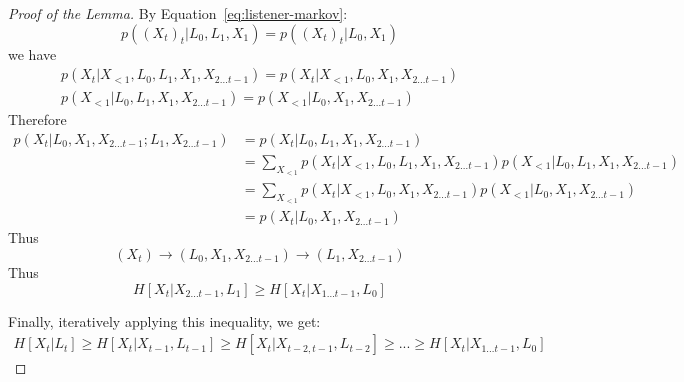 \documentclass[11pt,letterpaper]{article}
\begin{document}
	\begin{proof}[Proof of the Lemma]

By Equation~\ref{eq:listener-markov}:
	\begin{equation}
p((X_{t})_t| L_0, L_1, X_1)   = p((X_{t})_t| L_0, X_1)
	\end{equation}
we have
	\begin{align*}
p(X_t|X_{<1}, L_0, L_1, X_1, X_{2 \dots t-1}) = p(X_t|X_{<1}, L_0,  X_1, X_{2 \dots t-1}) \\
p(X_{<1}| L_0, L_1, X_1, X_{2 \dots t-1})   = p(X_{<1}| L_0, X_1, X_{2 \dots t-1})
	\end{align*}
Therefore
\begin{align*}
p(X_t|L_0, X_1, X_{2 \dots t-1}; L_1, X_{2 \dots t-1}) & = p(X_t|L_0, L_1, X_1, X_{2 \dots t-1}) \\
& = \sum_{X_{<1}} p(X_t|X_{<1}, L_0, L_1, X_1, X_{2 \dots t-1}) p(X_{<1}| L_0, L_1, X_1, X_{2 \dots t-1}) \\
&= \sum_{X_{<1}} p(X_t|X_{<1}, L_0,  X_1, X_{2 \dots t-1}) p(X_{<1}| L_0, X_1, X_{2 \dots t-1}) \\
&= p(X_t|L_0,  X_1, X_{2 \dots t-1}) 
\end{align*}
Thus
\begin{equation}
(X_t) \rightarrow (L_0, X_1, X_{2 \dots t-1})   \rightarrow   (L_1, X_{2 \dots t-1})
\end{equation}
Thus
	\begin{equation}
H[X_t| X_{2 \dots t-1}, L_{1}] \geq H[X_t|X_{1 \dots t-1}, L_0]
	\end{equation}

Finally, iteratively applying this inequality, we get:
		\begin{align*}
		H[X_t | L_t] \geq H[X_t| X_{t-1}, L_{t-1}] \geq H[X_t| X_{t-2, t-1}, L_{t-2}] \geq ... \geq H[X_t|X_{1 \dots t-1}, L_0]
		\end{align*}

	\end{proof}
	

\end{document}
